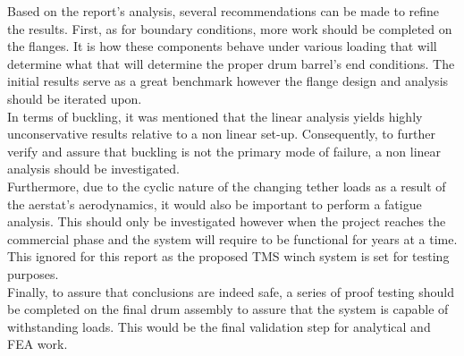 
Based on the report's analysis, several recommendations can be made to refine the results. First, as for boundary conditions, more work should be completed on the flanges. It is how these components behave under various loading that will determine what that will determine the proper drum barrel's end conditions. The initial results serve as a great benchmark however the flange design and analysis should be iterated upon.\\

In terms of buckling, it was mentioned that the linear analysis yields highly unconservative results relative to a non linear set-up. Consequently, to further verify and assure that buckling is not the primary mode of failure, a non linear analysis should be investigated.\\

Furthermore, due to the cyclic nature of the changing tether loads as a result of the aerstat's aerodynamics, it would also be important to perform a fatigue analysis. This should only be investigated however when the project reaches the commercial phase and the system will require to be functional for years at a time. This ignored for this report as the proposed TMS winch system is set for testing purposes.\\

Finally, to assure that conclusions are indeed safe, a series of proof testing should be completed on the final drum assembly to assure that the system is capable of withstanding loads. This would be the final validation step for analytical and FEA work.
